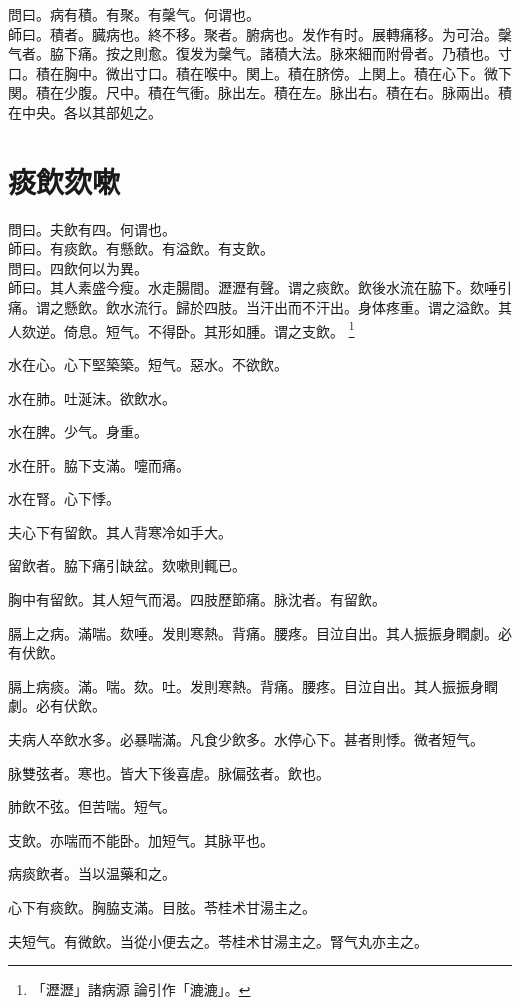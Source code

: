 問曰。病有積。有聚。有䅽气。何谓也。\\
師曰。積者。臓病也。終不移。聚者。腑病也。发作有时。展轉痛移。为可治。䅽气者。脇下痛。按之則愈。復发为䅽气。諸積大法。脉來細而附骨者。乃積也。寸口。積在胸中。微出寸口。積在喉中。関上。積在脐傍。上関上。積在心下。微下関。積在少腹。尺中。積在气衝。脉出左。積在左。脉出右。積在右。脉兩出。積在中央。各以其部処之。

\chapter{痰飲欬嗽}

問曰。夫飲有四。何谓也。\\
師曰。有痰飲。有懸飲。有溢飲。有支飲。\\
問曰。四飲何以为異。\\
師曰。其人素盛今瘦。水走腸間。瀝瀝有聲。谓之痰飲。飲後水流在脇下。欬唾引痛。谓之懸飲。飲水流行。歸於四肢。当汗出而不汗出。身体疼重。谓之溢飲。其人欬逆。倚息。短气。不得卧。其形如腫。谓之支飲。
	\footnote{
		「瀝瀝」諸病源{\sungtpii 𠊱}論引作「漉漉」。
	}

水在心。心下堅築{\khaaitp 築}。短气。惡水。不欲飲。

水在肺。吐涎沫。欲飲水。

水在脾。少气。身重。

水在肝。脇下支滿。嚏而痛。

水在腎。心下悸。

夫心下有留飲。其人背寒冷如手大。

留飲者。脇下痛引缺盆。欬嗽則輒已。

胸中有留飲。其人短气而渴。四肢歷節痛。脉沈者。有留飲。

膈上之病。滿喘。欬唾。发則寒熱。背痛。腰疼。目泣自出。其人振振身瞤劇。必有伏飲。{\wuben}

膈上病痰。滿。喘。欬。吐。发則寒熱。背痛。腰疼。目泣自出。其人振振身瞤劇。必有伏飲。{\dengben}

夫病人卒飲水多。必暴喘滿。凡食少飲多。水停心下。甚者則悸。微者短气。

脉雙弦者。寒也。皆大下後喜虗。脉偏弦者。飲也。

肺飲不弦。但苦喘。短气。

支飲。亦喘而不能卧。加短气。其脉平也。

病痰飲者。当以温藥和之。

心下有痰飲。胸脇支滿。目胘。苓桂术甘湯主之。

夫短气。有微飲。当從小便去之。苓桂术甘湯主之。腎气丸亦主之。

